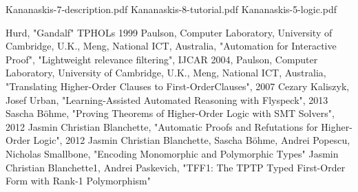 \documentclass[a4paper, 11pt]{article}
\theoremstyle{plain}
\theoremstyle{definition}
\theoremstyle{remark}
\begin{document}
\pagebreak
\begin{thebibliography}{3}
Kananaskis-7-description.pdf
Kananaskis-8-tutorial.pdf
Kananaskis-5-logic.pdf

Hurd, "Gandalf" TPHOLs 1999
Paulson, Computer Laboratory, University of Cambridge, U.K.,
Meng, National ICT, Australia,
"Automation for Interactive Proof", 
"Lightweight relevance filtering",
IJCAR 2004, 
Paulson, Computer Laboratory, University of Cambridge, U.K., 
Meng, National ICT, Australia, 
"Translating Higher-Order Clauses to First-OrderClauses",
2007
Cezary Kaliszyk, 
Josef Urban, 
"Learning-Assisted Automated Reasoning with Flyspeck", 
2013
Sascha B\"ohme, 
"Proving Theorems of Higher-Order Logic with SMT Solvers", 
2012
Jasmin Christian Blanchette, 
"Automatic Proofs and Refutations for Higher-Order Logic", 
2012
Jasmin Christian Blanchette, 
Sascha Böhme, 
Andrei Popescu, 
Nicholas Smallbone, 
"Encoding Monomorphic and Polymorphic Types"
Jasmin Christian Blanchette1,
Andrei Paskevich,
"TFF1: The TPTP Typed First-Order Form with Rank-1 Polymorphism"

\end{thebibliography}
\end{document}
